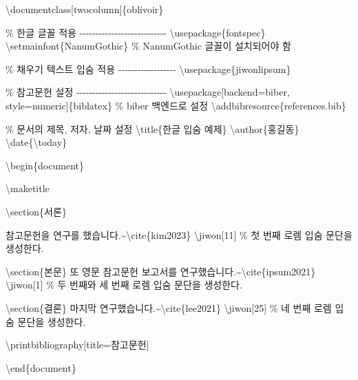 \documentclass[
  letterpaper,
]{book}
\newenvironment{Shaded}{\begin{snugshade}}{\end{snugshade}}
\newcommand{\BuiltInTok}[1]{\textcolor[rgb]{0.00,0.23,0.31}{#1}}
\newcommand{\CommentTok}[1]{\textcolor[rgb]{0.37,0.37,0.37}{#1}}
\newcommand{\ExtensionTok}[1]{\textcolor[rgb]{0.00,0.23,0.31}{#1}}
\newcommand{\FunctionTok}[1]{\textcolor[rgb]{0.28,0.35,0.67}{#1}}
\newcommand{\KeywordTok}[1]{\textcolor[rgb]{0.00,0.23,0.31}{#1}}
\newcommand{\NormalTok}[1]{\textcolor[rgb]{0.00,0.23,0.31}{#1}}
\begin{document}
\begin{Shaded}
\begin{Highlighting}[]
\BuiltInTok{\textbackslash{}documentclass}\NormalTok{[twocolumn]\{}\ExtensionTok{oblivoir}\NormalTok{\}}

\CommentTok{\% 한글 글꼴 적용 {-}{-}{-}{-}{-}{-}{-}{-}{-}{-}{-}{-}{-}{-}{-}{-}{-}{-}{-}{-}{-}{-}{-}{-}{-}{-}{-}}
\BuiltInTok{\textbackslash{}usepackage}\NormalTok{\{}\ExtensionTok{fontspec}\NormalTok{\}}
\FunctionTok{\textbackslash{}setmainfont}\NormalTok{\{NanumGothic\} }\CommentTok{\% NanumGothic 글꼴이 설치되어야 함}

\CommentTok{\% 채우기 텍스트 입숨 적용 {-}{-}{-}{-}{-}{-}{-}{-}{-}{-}{-}{-}{-}{-}{-}{-}{-}{-}}
\BuiltInTok{\textbackslash{}usepackage}\NormalTok{\{}\ExtensionTok{jiwonlipsum}\NormalTok{\}}

\CommentTok{\% 참고문헌 설정 {-}{-}{-}{-}{-}{-}{-}{-}{-}{-}{-}{-}{-}{-}{-}{-}{-}{-}{-}{-}{-}{-}{-}{-}{-}{-}{-}{-}}
\BuiltInTok{\textbackslash{}usepackage}\NormalTok{[backend=biber, style=numeric]\{}\ExtensionTok{biblatex}\NormalTok{\} }\CommentTok{\% biber 백엔드로 설정}
\FunctionTok{\textbackslash{}addbibresource}\NormalTok{\{references.bib\}}


\CommentTok{\% 문서의 제목, 저자, 날짜 설정}
\FunctionTok{\textbackslash{}title}\NormalTok{\{한글 입숨 예제\}}
\FunctionTok{\textbackslash{}author}\NormalTok{\{홍길동\}}
\FunctionTok{\textbackslash{}date}\NormalTok{\{}\FunctionTok{\textbackslash{}today}\NormalTok{\}}

\KeywordTok{\textbackslash{}begin}\NormalTok{\{}\ExtensionTok{document}\NormalTok{\}    }
    
    \FunctionTok{\textbackslash{}maketitle}
    
    \KeywordTok{\textbackslash{}section}\NormalTok{\{서론\}}
    
\NormalTok{    참고문헌을 연구를 했습니다.\textasciitilde{}}\KeywordTok{\textbackslash{}cite}\NormalTok{\{}\ExtensionTok{kim2023}\NormalTok{\}}
    \FunctionTok{\textbackslash{}jiwon}\NormalTok{[11] }\CommentTok{\% 첫 번째 로렘 입숨 문단을 생성한다.}
    
    \KeywordTok{\textbackslash{}section}\NormalTok{\{본문\}}
\NormalTok{    또 영문 참고문헌 보고서를 연구했습니다.\textasciitilde{}}\KeywordTok{\textbackslash{}cite}\NormalTok{\{}\ExtensionTok{ipsum2021}\NormalTok{\}}
    \FunctionTok{\textbackslash{}jiwon}\NormalTok{[1] }\CommentTok{\% 두 번째와 세 번째 로렘 입숨 문단을 생성한다.}
    
    \KeywordTok{\textbackslash{}section}\NormalTok{\{결론\}}
\NormalTok{    마지막 연구했습니다.\textasciitilde{}}\KeywordTok{\textbackslash{}cite}\NormalTok{\{}\ExtensionTok{lee2021}\NormalTok{\}}
    \FunctionTok{\textbackslash{}jiwon}\NormalTok{[25] }\CommentTok{\% 네 번째 로렘 입숨 문단을 생성한다.}
    
    \FunctionTok{\textbackslash{}printbibliography}\NormalTok{[title=참고문헌]}
    
\KeywordTok{\textbackslash{}end}\NormalTok{\{}\ExtensionTok{document}\NormalTok{\}}
\end{Highlighting}
\end{Shaded}
\end{document}
